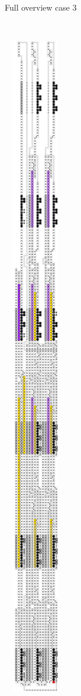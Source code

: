 \begin{figure}[H]
\begin{subfigure}[t]{0.3\textwidth}
        \caption{\label{fig:full_overview_case3_colored} Full overview case 3}
    \end{subfigure}%
    ~
    \begin{subfigure}[t]{0.3\textwidth}
        \centering
        \includegraphics[width=0.3\textwidth]{full_overview_case2_colored}

\end{subfigure}
\end{figure}
